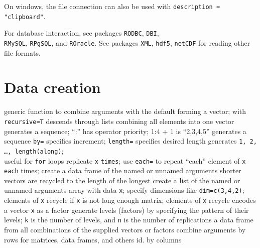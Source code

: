 {On windows, the file connection can also be used with {\tt description =
"clipboard"}.



For database interaction, see packages {\tt RODBC}, {\tt DBI},\\
{\tt RMySQL}, {\tt RPgSQL}, and {\tt ROracle}. See packages {\tt XML},
{\tt hdf5}, {\tt netCDF} for reading other file formats.

\section{Data creation}{}

	{generic function to combine arguments with the default forming a vector; with {\tt recursive=T} descends through lists combining all elements into one vector}
	{generates a sequence; ``:'' has operator priority; 1:4 + 1 is ``2,3,4,5''}
	{generates a sequence {\tt by=} specifies increment; {\tt length=} specifies desired length}
	{generates {\tt 1, 2, \ldots, length(along)};\\useful for {\tt for} loops}
	{replicate {\tt x} {\tt times}; use {\tt each=} to repeat ``each'' element of {\tt x} {\tt each} times;}
	{create a data frame of the named or unnamed arguments}
	{shorter vectors are recycled to the length of the longest}
	{create a list of the named or unnamed arguments }
	{array with data {\tt x}; specify dimensions like {\tt dim=c(3,4,2)}; elements of {\tt x} recycle if {\tt x} is not long enough}
	{matrix; elements of {\tt x} recycle}
	{encodes a vector {\tt x} as a factor}
	{generate levels (factors) by specifying the pattern of their levels; {\tt k} is the number of levels, and {\tt n} is the number of replications}
	{a data frame from all combinations of the supplied vectors or factors}
	{combine arguments by rows for matrices, data frames, and others}
	{id. by columns}
}
